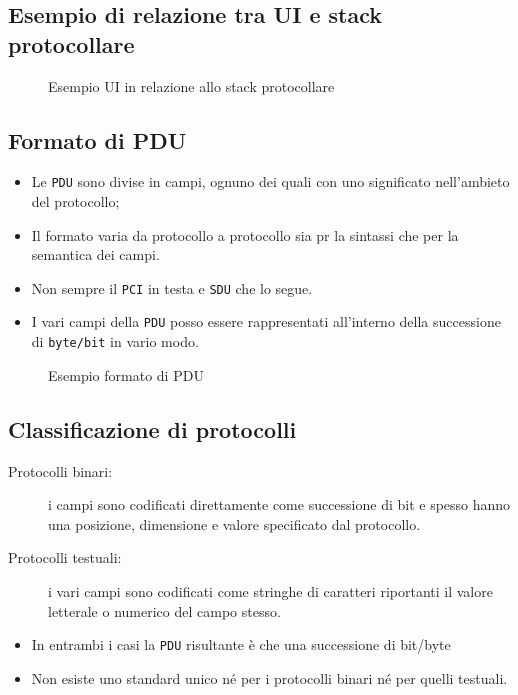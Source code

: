\documentclass{book}
\theoremstyle{definition}
\begin{document}
\subsection{Esempio di relazione tra UI e stack protocollare}
\label{sec:esstackprotpac}

\begin{figure}[ht!]
  \centering
   \resizebox{14cm}{!} {}
  \caption{Esempio UI in relazione allo stack protocollare}
  \label{fig:esrelUIstackprot}
\end{figure}

\subsection{Formato di PDU}
\label{sec:formatodipdu}

\begin{itemize}
\item Le \texttt{PDU} sono divise in campi, ognuno dei quali con uno significato nell'ambieto del protocollo;
\item Il formato varia da protocollo a protocollo sia pr la sintassi che per la semantica dei campi.
\item Non sempre il \texttt{PCI} in testa e \texttt{SDU} che lo segue.
\item I vari campi della \texttt{PDU} posso essere rappresentati all'interno della successione di
  \texttt{byte/bit} in vario modo.
\end{itemize}
\begin{figure}[ht!]
  \centering
   \resizebox{10cm}{!} {}
  \caption{Esempio formato di PDU}
  \label{fig:espdu}
\end{figure}

\subsection{Classificazione di protocolli}
\label{sec:classprot}

\begin{description}
\item[Protocolli binari:] 
  i campi sono codificati direttamente come successione di bit e spesso hanno una posizione, dimensione e
  valore specificato dal protocollo.
\item[Protocolli testuali:] i vari campi sono codificati come stringhe di caratteri riportanti il valore letterale
  o numerico del campo stesso.
\end{description}
\begin{itemize}
\item In entrambi i casi la \texttt{PDU} risultante è che una successione di bit/byte
\item Non esiste uno standard unico né per i protocolli binari né per quelli testuali.
\end{itemize}
\end{document}
